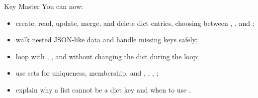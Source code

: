 \begin{achievement}{Key Master}
You can now:
\begin{itemize}
\item create, read, update, merge, and delete dict entries, choosing between \code{[ ]}, , and
;
\item walk nested JSON-like data and handle missing keys safely;
\item loop with , , and  without changing the dict during the loop;
\item use sets for uniqueness, membership, and \code{|}, \code{\&}, \code{-}, \code{\textasciicircum{}};
\item explain why a list cannot be a dict key and when to use .
\end{itemize}
\end{achievement}
